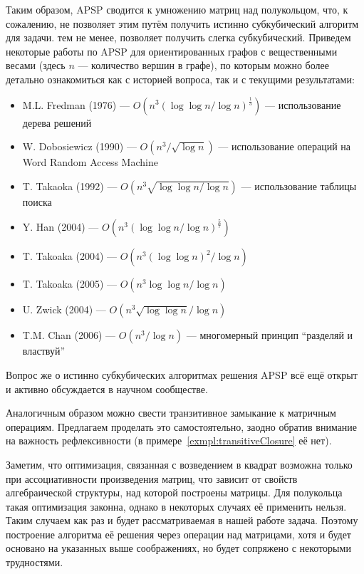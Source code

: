 Таким образом, APSP сводится к умножению матриц над полукольцом, что, к сожалению, не позволяет этим путём получить истинно субкубический алгоритм для задачи. тем не менее, позволяет получить слегка субкубический. Приведем некоторые работы по APSP для ориентированных графов с вещественными весами (здесь $n$ --- количество вершин в графе), по которым можно более детально ознакомиться как с историей вопроса, так и с текущими результатами:
\begin{itemize}
    \item M.L. Fredman (1976) --- $O(n^3(\log \log n / \log n)^\frac{1}{3})$ --- использование дерева решений~\cite{FredmanAPSP1976}
    \item W. Dobosiewicz (1990) --- $O(n^3 / \sqrt{\log n})$ --- использование операций на Word Random Access Machine~\cite{Dobosiewicz1990}
    \item T. Takaoka (1992) --- $O(n^3 \sqrt{\log \log n / \log n})$ --- использование таблицы поиска~\cite{Takaoka1992}
    \item Y. Han (2004) --- $O(n^3 (\log \log n / \log n)^\frac{5}{7})$~\cite{Han2004}
    \item T. Takoaka (2004) --- $O(n^3 (\log \log n)^2 / \log n)$~\cite{Takaoka2004}
    \item T. Takoaka (2005) --- $O(n^3 \log \log n / \log n)$~\cite{Takaoka2005}
    \item U. Zwick (2004) --- $O(n^3 \sqrt{\log \log n} / \log n)$~\cite{Zwick2004}
    \item T.M. Chan (2006) --- $O(n^3 / \log n)$ --- многомерный принцип ``разделяй и властвуй''~\cite{Chan2008}
\end{itemize}

Вопрос же о истинно субкубических алгоритмах решения APSP всё ещё открыт~\cite{Chan2010} и активно обсуждается в научном сообществе.

Аналогичным образом можно свести транзитивное замыкание к матричным операциям. Предлагаем проделать это самостоятельно, заодно обратив внимание на важность рефлексивности (в примере~\ref{exmpl:transitiveClosure} её нет).

Заметим, что оптимизация, связанная с возведением в квадрат возможна только при ассоциативности произведения матриц, что зависит от свойств алгебраической структуры, над которой построены матрицы. Для полукольца такая оптимизация законна, однако в некоторых случаях её применить нельзя. Таким случаем как раз и будет рассматриваемая в нашей работе задача. Поэтому построение алгоритма её решения через операции над матрицами, хотя и будет основано на указанных выше соображениях, но будет сопряжено с некоторыми трудностями.


